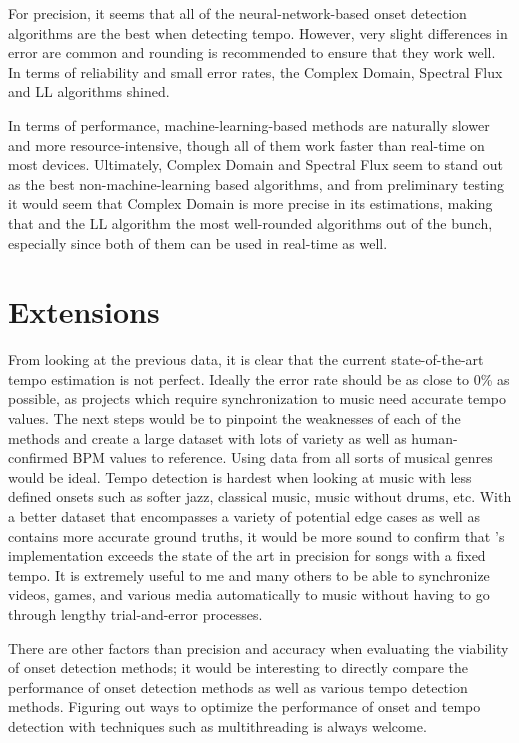 \documentclass[11pt, oneside]{article}
\begin{document}
For precision, it seems that all of the neural-network-based onset detection
algorithms are the best when detecting tempo. However, very slight differences
in error are common and rounding is recommended to ensure that they work well.
In terms of reliability and small error rates, the Complex Domain, Spectral Flux
and LL algorithms shined.

In terms of performance, machine-learning-based methods are naturally slower and
more resource-intensive, though all of them work faster than real-time on most
devices. Ultimately, Complex Domain and Spectral Flux seem to stand out as the
best non-machine-learning based algorithms, and from preliminary testing it
would seem that Complex Domain is more precise in its estimations, making that
and the LL algorithm the most well-rounded algorithms out of the bunch,
especially since both of them can be used in real-time as well.


\section{Extensions}

From looking at the previous data, it is clear that the current state-of-the-art
tempo estimation is not perfect. Ideally the error rate should be as close to
0\% as possible, as projects which require synchronization to music need
accurate tempo values. The next steps would be to pinpoint the weaknesses of
each of the methods and create a large dataset with lots of variety as well as
human-confirmed BPM values to reference. Using data from all sorts of musical
genres would be ideal. Tempo detection is hardest when looking at music with
less defined onsets such as softer jazz, classical music, music without drums,
etc. With a better dataset that encompasses a variety of potential edge cases as
well as contains more accurate ground truths, it would be more sound to confirm
that \citeauthor*{bram}'s implementation exceeds the state of the art in
precision for songs with a fixed tempo. It is extremely useful to me and many
others to be able to synchronize videos, games, and various media automatically
to music without having to go through lengthy trial-and-error processes.

There are other factors than precision and accuracy when evaluating the
viability of onset detection methods; it would be interesting to directly
compare the performance of onset detection methods as well as various tempo
detection methods. Figuring out ways to optimize the performance of onset and
tempo detection with techniques such as multithreading is always welcome.
\end{document}
